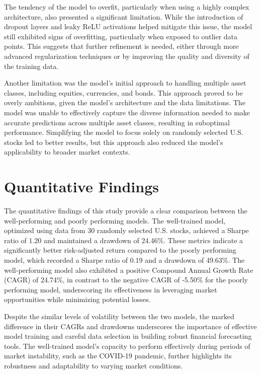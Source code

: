 The tendency of the model to overfit, particularly when using a highly complex architecture, also presented a significant limitation. While the introduction of dropout layers and leaky ReLU activations helped mitigate this issue, the model still exhibited signs of overfitting, particularly when exposed to outlier data points. This suggests that further refinement is needed, either through more advanced regularization techniques or by improving the quality and diversity of the training data.

Another limitation was the model's initial approach to handling multiple asset classes, including equities, currencies, and bonds. This approach proved to be overly ambitious, given the model's architecture and the data limitations. The model was unable to effectively capture the diverse information needed to make accurate predictions across multiple asset classes, resulting in suboptimal performance. Simplifying the model to focus solely on randomly selected U.S. stocks led to better results, but this approach also reduced the model's applicability to broader market contexts.


\section{Quantitative Findings}

The quantitative findings of this study provide a clear comparison between the well-performing and poorly performing models. The well-trained model, optimized using data from 30 randomly selected U.S. stocks, achieved a Sharpe ratio of 1.20 and maintained a drawdown of 24.46\%. These metrics indicate a significantly better risk-adjusted return compared to the poorly performing model, which recorded a Sharpe ratio of 0.19 and a drawdown of 49.63\%. The well-performing model also exhibited a positive Compound Annual Growth Rate (CAGR) of 24.74\%, in contrast to the negative CAGR of -5.50\% for the poorly performing model, underscoring its effectiveness in leveraging market opportunities while minimizing potential losses.

Despite the similar levels of volatility between the two models, the marked difference in their CAGRs and drawdowns underscores the importance of effective model training and careful data selection in building robust financial forecasting tools. The well-trained model's capacity to perform effectively during periods of market instability, such as the COVID-19 pandemic, further highlights its robustness and adaptability to varying market conditions.

